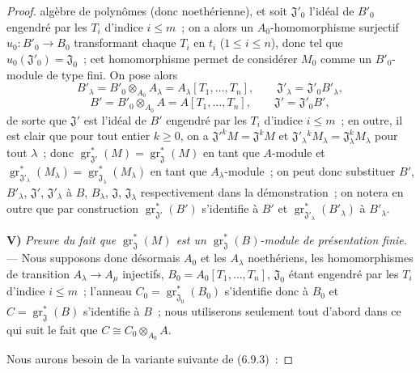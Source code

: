 \begin{proof}
algèbre de polynômes (donc noethérienne), et soit $\mathfrak J'_0$ l'idéal de
$B'_0$ engendré par les $T_i$ d'indice $i\leq m$~; on a alors un
$A_0$-homomorphisme surjectif $u_0:B'_0\to B_0$ transformant chaque $T_i$ en
$t_i$ ($1\leq i\leq n$), donc tel que $u_0(\mathfrak J'_0)=\mathfrak J_0$~;
cet homomorphisme permet de considérer $M_0$ comme un $B'_0$-module de type
fini. On pose alors
\[
B'_\lambda=B'_0\otimes_{A_0}A_\lambda
=A_\lambda[T_1,\ldots,T_n],\qquad
\mathfrak J'_\lambda=\mathfrak J'_0B'_\lambda,
\]
\[
B'=B'_0\otimes_{A_0}A=A[T_1,\ldots,T_n],\qquad
\mathfrak J'=\mathfrak J'_0B',
\]
de sorte que $\mathfrak J'$ est l'idéal de $B'$ engendré par les $T_i$
d'indice $i\leq m$~; en outre, il est clair que pour tout entier $k\geq0$,
on a $\mathfrak J'^kM=\mathfrak J^kM$ et
$\mathfrak J'_\lambda{}^kM_\lambda=\mathfrak J_\lambda^kM_\lambda$ pour tout
$\lambda$~; donc
$\operatorname{gr}_{\mathfrak J'}^*(M)=\operatorname{gr}_{\mathfrak J}^*(M)$
en tant que $A$-module et
$\operatorname{gr}_{\mathfrak J'_\lambda}^*(M_\lambda)
=\operatorname{gr}_{\mathfrak J_\lambda}^*(M_\lambda)$ en tant que
$A_\lambda$-module~; on peut donc substituer $B'$, $B'_\lambda$,
$\mathfrak J'$, $\mathfrak J'_\lambda$ à $B$, $B_\lambda$, $\mathfrak J$,
$\mathfrak J_\lambda$ respectivement dans la démonstration~; on notera en
outre que par construction $\operatorname{gr}_{\mathfrak J'}^*(B')$
s'identifie à $B'$ et $\operatorname{gr}_{\mathfrak J'_\lambda}^*(B'_\lambda)$
à $B'_\lambda$.

\medskip
\noindent\textbf{V)} \emph{Preuve du fait que
$\operatorname{gr}_{\mathfrak J}^*(M)$ est un
$\operatorname{gr}_{\mathfrak J}^*(B)$-module de présentation finie.} --- Nous
supposons donc désormais $A_0$ et les $A_\lambda$ noethériens, les
homomorphismes de transition $A_\lambda\to A_\mu$ injectifs,
$B_0=A_0[T_1,\ldots,T_n]$, $\mathfrak J_0$ étant engendré par les $T_i$
d'indice $i\leq m$~; l'anneau
$C_0=\operatorname{gr}_{\mathfrak J_0}^*(B_0)$ s'identifie donc à $B_0$ et
$C=\operatorname{gr}_{\mathfrak J}^*(B)$ s'identifie à $B$~; nous utiliserons
seulement tout d'abord dans ce qui suit le fait que
$C\cong C_0\otimes_{A_0}A$.

Nous aurons besoin de la variante suivante de (6.9.3)~:


\end{proof}
